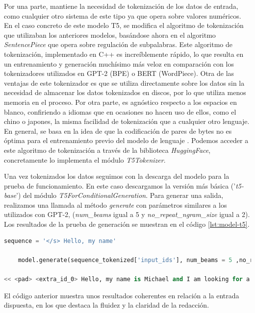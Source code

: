 Por una parte, mantiene la necesidad de tokenización de los datos de entrada, como cualquier otro sistema de este tipo ya que opera sobre valores numéricos. En el caso concreto de este modelo T5, se modifica el algoritmo de tokenización que utilizaban los anteriores modelos, basándose ahora en el algoritmo \textit{SentencePiece} que opera sobre regulación de subpalabras. Este algoritmo de tokenización, implementado en C++ es increíblemente rápido, lo que resulta en un entrenamiento y generación muchísimo más veloz en comparación con los tokenizadores utilizados en GPT-2 (BPE) o BERT (WordPiece). Otra de las ventajas de este tokenizador es que se utiliza directamente sobre los datos sin la necesidad de almacenar los datos tokenizados en discos, por lo que utiliza menos memoria en el proceso. Por otra parte, es agnóstico respecto a los espacios en blanco, confiriendo a idiomas que en ocasiones no hacen uso de ellos, como el chino o japones, la misma facilidad de tokenización que a cualquier otro lenguaje. En general, se basa en la idea de que la codificación de pares de bytes no es óptima para el entrenamiento previo del modelo de lenguaje \citep{bostrom-durrett-2020-byte}. Podemos acceder a este algoritmo de tokenización a través de la biblioteca \textit{HuggingFace}, concretamente lo implementa el módulo \textit{T5Tokenizer}. 

Una vez tokenizados los datos seguimos con la descarga del modelo para la prueba de funcionamiento. En este caso descargamos la versión más básica ('\textit{t5-base}') del módulo \textit{T5ForConditionalGeneration}. Para generar una salida, realizamos una llamada al método \textit{generate} con parámetros similares a los utilizados con GPT-2, (\textit{num\_beams} igual a 5 y \textit{no\_repeat\_ngram\_size} igual a 2). Los resultados de la prueba de generación se muestran en el código \ref{lst:model-t5}.


\begin{lstlisting}[language=Python, caption=Ejemplo de generación con el modelo pre-entrenado \textit{T5- base}, label={lst:model-t5}]
	sequence = '</s> Hello, my name'
	
	model.generate(sequence_tokenized['input_ids'], num_beams = 5 ,no_repeat_ngram_size = 2)
	
<< <pad> <extra_id_0> Hello, my name is Michael and I am looking for a new name.
\end{lstlisting} 


El código anterior muestra unos resultados coherentes en relación a la entrada dispuesta, en los que destaca la fluidez y la claridad de la redacción.




